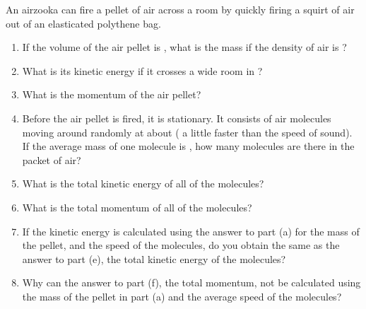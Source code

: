 
\begin{problem}[Robin9]
{An airzooka can fire a pellet of air across a room by quickly firing a squirt of air out of an elasticated polythene bag. 
\begin{enumerate}
	\item If the volume of the air pellet is , what is the mass if the density of air is ?
	\item What is its kinetic energy if it crosses a  wide room in ?
	\item What is the momentum of the air pellet?
	\item Before the air pellet is fired, it is stationary.  It consists of air molecules moving around randomly at about  ( a little faster than the speed of sound).  If the average mass of one molecule is , how many molecules are there in the  packet of air?
	\item What is the total kinetic energy of all of the molecules?
	\item What is the total momentum of all of the molecules?
	\item If the kinetic energy is calculated using the answer to part (a) for the mass of the pellet, and the  speed of the molecules, do you obtain the same as the answer to part (e), the total kinetic energy of the molecules?
	\item Why can the answer to part (f), the total momentum, not be calculated using the mass of the pellet in part (a) and the  average speed of the molecules?
\end{enumerate}
}
{}
{}
\end{problem}
